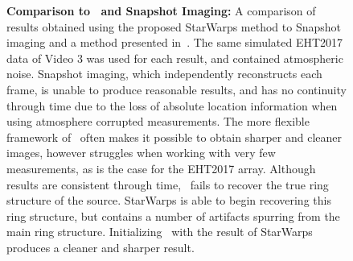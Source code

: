 \begin{figure}
\begin{center}
		\caption{{\bf Comparison to~\cite{Johnson_dynamical} and Snapshot Imaging:} A comparison of results obtained using the proposed StarWarps method to Snapshot imaging and a method presented in~\cite{Johnson_dynamical}. The same simulated EHT2017 data of Video 3 was used for each result, and contained atmospheric noise. Snapshot imaging, which independently reconstructs each frame, is unable to produce reasonable results, and has no continuity through time due to the loss of absolute location information when using atmosphere corrupted measurements. The more flexible framework of~\cite{Johnson_dynamical} often makes it possible to obtain sharper and cleaner images, however struggles when working with very few measurements, as is the case for the EHT2017 array. Although results are consistent through time,~\cite{Johnson_dynamical} fails to recover the true ring structure of the source. StarWarps is able to begin recovering this ring structure, but contains a number of artifacts spurring from the main ring structure. Initializing~\cite{Johnson_dynamical} with the result of StarWarps produces a cleaner and sharper result.  
			 }
		\label{fig:dynamicimagingcmp}
	\end{center}
\end{figure}














